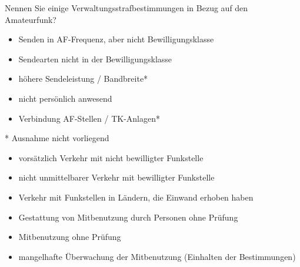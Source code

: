 \documentclass[avery5371,grid,frame,a4paper]{flashcards}
\newcommand{\card}[3]{
  \begin{flashcard}[{\chap} -- #1]{#2}#3\end{flashcard}
}
\begin{document}
\card{37}{Nennen Sie einige Verwaltungsstrafbestimmungen in Bezug auf den Amateurfunk?}{
\scriptsize
  \begin{minipage}{0.48\textwidth}
    \begin{itemize}[leftmargin=10pt,itemsep=0pt]
      \item Senden in AF-Frequenz, aber nicht Bewilligungsklasse
      \item Sendearten nicht in der Bewilligungsklasse
      \item höhere Sendeleistung / Bandbreite*
      \item nicht persönlich anwesend
      \item Verbindung AF-Stellen / TK-Anlagen*
    \end{itemize}
    * \quad Ausnahme nicht vorliegend
  \end{minipage}
  \begin{minipage}{0.5\textwidth}
    \begin{itemize}[leftmargin=10pt,itemsep=0pt]
      \item vorsätzlich Verkehr mit nicht bewilligter Funkstelle
      \item nicht unmittelbarer Verkehr mit bewilligter Funkstelle
      \item Verkehr mit Funkstellen in Ländern, die Einwand erhoben haben
      \item Gestattung von Mitbenutzung durch Personen ohne Prüfung
      \item Mitbenutzung ohne Prüfung
      \item mangelhafte Überwachung der Mitbenutzung (Einhalten der Bestimmungen)
    \end{itemize}
  \end{minipage}
}
\end{document}

